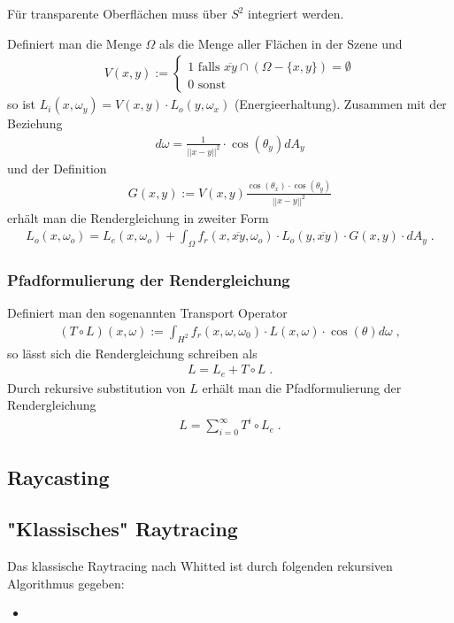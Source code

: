 \begin{Bemerkung}
Für transparente Oberflächen muss über $S^2$ integriert werden.
\end{Bemerkung}
Definiert man die Menge $\Omega$  als die Menge aller Flächen  in der Szene und
\begin{align}
V(x,y) := \begin{cases}
1 \text{ falls } \overline{xy} \cap (\Omega -\{x,y\}) = \emptyset \\
0 \text{ sonst }
\end{cases}
\end{align}
so ist $L_i(x, \omega_y) = V(x,y) \cdot L_o(y, \omega_x)$ (Energieerhaltung).
Zusammen mit der Beziehung 
\begin{align}
d\omega =  \frac{1}{||x -y||^2} \cdot  \cos(\theta_y) dA_y
\end{align}
 und der Definition 
\begin{align}
G(x,y) := V(x,y)  \frac{ \cos(\theta_x) \cdot  \cos(\theta_y)}{||x -y||^2} 
\end{align}
erhält man die Rendergleichung in zweiter Form 
\begin{align}
L_o(x, \omega_o) = L_e(x, \omega_o)  + \displaystyle \int_{\Omega} f_r (x, \overline{xy}, \omega_o) \cdot   L_o(y, \overline{xy})  \cdot  G(x,y) \cdot   dA_y \; .
\end{align} 

\subsubsection{Pfadformulierung der Rendergleichung}
Definiert man den sogenannten Transport  Operator
\begin{align}
(T \circ  L)(x, \omega) :=  \displaystyle \int_{H^2}f_r (x, \omega, \omega_0) \cdot L(x, \omega)  \cdot  \cos(\theta) d\omega \; ,
\end{align}
so lässt sich die Rendergleichung schreiben als
\begin{align}
L = L_e + T \circ L \; .
\end{align}
Durch rekursive substitution von $L$ erhält man die  Pfadformulierung der Rendergleichung
\begin{align}
L = \sum_{i= 0}^{\infty} T^i \circ L_e \; .
\end{align}

 
\subsection{Raycasting}
\subsection{"Klassisches" Raytracing}
Das klassische Raytracing nach Whitted ist durch folgenden rekursiven Algorithmus gegeben:
\begin{itemize}
\item 
\end{itemize}

